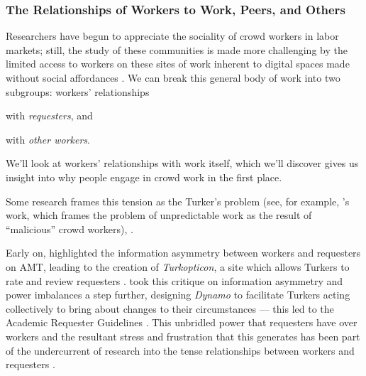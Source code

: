 \documentclass[trackingWork]{subfiles}
\begin{document}
\subsubsection[What will work and the place of work look like for workers]{The Relationships of Workers to Work, Peers, and Others}
\label{sec:relationships}

\subsubsubsection{\crowdworkpers}
Researchers have begun to appreciate
the sociality of crowd workers in labor markets;
still, the study of these communities is made more challenging by
the limited access to workers on these sites of work
inherent to digital spaces made without social affordances
\cite{crowdcollab,miller2011understanding}.
We can break this general body of work into two subgroups:
workers' relationships
\begin{inlinelist}
\item with \textit{requesters}, and
\item with \textit{other workers}.
\end{inlinelist}
We'll look at workers' relationships with work itself, which we'll discover
gives us insight into why people engage in crowd work in the first place.

Some research frames this tension as the Turker's problem
(see, for example, \citeauthor{MaliciousCrowdworkersGadiraju}'s work,
which frames the problem of unpredictable work as the result of ``malicious'' crowd workers),
\cite{MaliciousCrowdworkersGadiraju,Sheng:2008:GLI:1401890.1401965,Ipeirotis:2010:QMA:1837885.1837906}.

Early on, \citeauthor{turkopticon} highlighted
the information asymmetry between workers and requesters on AMT,
leading to the creation of \textit{Turkopticon}, a site which allows
Turkers to rate and review requesters
\cite{turkopticon}.
\citeauthor{dynamo} took this critique on information asymmetry and power imbalances a step further,
designing \textit{Dynamo} to facilitate
Turkers acting collectively to bring about changes to their circumstances
--- this led to the Academic Requester Guidelines
\cite{dynamo}.
This unbridled power that requesters have over workers and
the resultant stress and frustration that this generates
has been part of the undercurrent of research into
the tense relationships between workers and requesters
\cite{fixingChaos,dynamo}.
\end{document}
